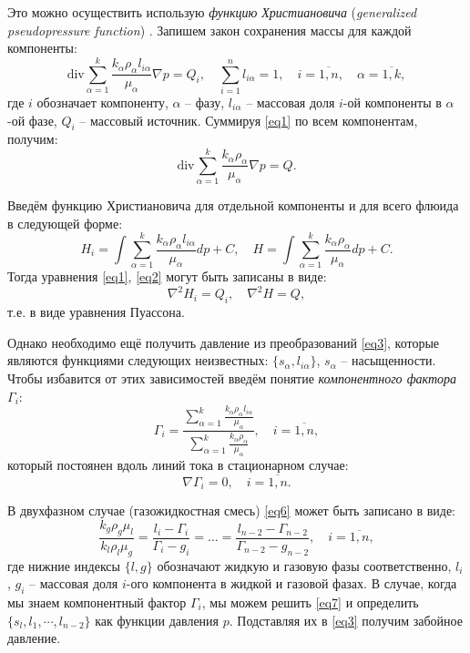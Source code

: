 	Это можно осуществить использую \textit{функцию Христиановича} (\textit{generalized pseudopressure function}) \cite{multiphase}.
	Запишем закон сохранения массы для каждой компоненты:
\begin{equation}
	\label{eq1}
	\text{div}\sum_{\alpha=1}^{k}\frac{k_\alpha\rho_\alpha l_{i\alpha}}{\mu_\alpha}\nabla p = Q_i, \quad \sum_{i = 1}^{n}l_{i\alpha} = 1, \quad i = \overline{1, n}, \quad \alpha = \overline{1, k},
\end{equation}
	где $i$ обозначает компоненту, $\alpha$ -- фазу,
	$l_{i\alpha}$ -- массовая доля $i$-ой компоненты в $\alpha$-ой фазе,
	$Q_i$ -- массовый источник.
	Суммируя \eqref{eq1} по всем компонентам, получим:
\begin{equation}
	\label{eq2}
	\text{div}\sum_{\alpha=1}^{k}\frac{k_\alpha\rho_\alpha }{\mu_\alpha}\nabla p = Q.
\end{equation}

	Введём функцию Христиановича для отдельной компоненты и для всего флюида в следующей форме:
\begin{equation}
	\label{eq3}
	H_i = \int\sum_{\alpha=1}^{k}\frac{k_\alpha\rho_\alpha l_{i\alpha}}{\mu_\alpha}dp + C, \quad
	H = \int\sum_{\alpha=1}^{k}\frac{k_\alpha\rho_\alpha }{\mu_\alpha}dp + C.
\end{equation}
	Тогда уравнения \eqref{eq1}, \eqref{eq2} могут быть записаны в виде:
\begin{equation}
	\label{eq4}
	\nabla^2 H_i = Q_i, \quad \nabla^2 H = Q,
\end{equation}
	т.е. в виде уравнения Пуассона.
	
	Однако необходимо ещё получить давление из преобразований \eqref{eq3}, которые являются функциями следующих неизвестных: $\{s_\alpha, l_{i\alpha}\}$, $s_{\alpha}$ -- насыщенности.
	Чтобы избавится от этих зависимостей введём понятие \textit{компонентного фактора} $\Gamma_i$:
\begin{equation}
	\label{eq5}
	\Gamma_i = \frac{\displaystyle\sum_{\alpha=1}^{k}\frac{k_\alpha\rho_\alpha l_{i\alpha}}{\mu_\alpha}}{\displaystyle\sum_{\alpha=1}^{k}\frac{k_\alpha\rho_\alpha}{\mu_\alpha}}, \quad i = \overline{1, n},
\end{equation}	
	который постоянен вдоль линий тока в стационарном случае:
\begin{equation}
	\label{eq6}
	\nabla\Gamma_i = 0, \quad i=\overline{1, n}.
\end{equation}

	В двухфазном случае (газожидкостная смесь) \eqref{eq6} может быть записано в виде:
\begin{equation}
	\label{eq7}
	 \frac{k_g\rho_g\mu_l}{k_l\rho_l\mu_g} = \frac{l_i - \Gamma_i}{\Gamma_i-g_i} = \dots = \frac{l_{n-2} - \Gamma_{n-2}}{\Gamma_{n-2}-g_{n-2}}, \quad  i = \overline{1, n},
\end{equation}
	где нижние индексы $\{l, g\}$ обозначают жидкую и газовую фазы соответственно,
	$l_i$, $g_i$ -- массовая доля $i$-ого компонента в жидкой и газовой фазах.
	В случае, когда мы знаем компонентный фактор $\Gamma_i$, мы можем решить \eqref{eq7} и определить $\{s_l, l_1, \cdots, l_{n-2}\}$ как функции давления $p$. Подставляя их в \eqref{eq3} получим забойное давление.


